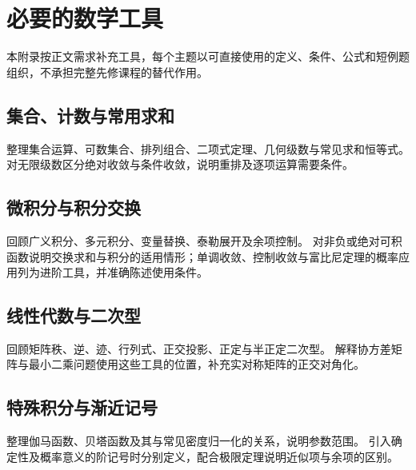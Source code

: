 \setcounter{chapter}{0} %
\chapter{必要的数学工具}
\label{app:ps-prerequisites}

本附录按正文需求补充工具，每个主题以可直接使用的定义、条件、公式和短例题组织，不承担完整先修课程的替代作用。

\section{集合、计数与常用求和}
整理集合运算、可数集合、排列组合、二项式定理、几何级数与常见求和恒等式。
对无限级数区分绝对收敛与条件收敛，说明重排及逐项运算需要条件。

\section{微积分与积分交换}
回顾广义积分、多元积分、变量替换、泰勒展开及余项控制。
对非负或绝对可积函数说明交换求和与积分的适用情形；单调收敛、控制收敛与富比尼定理的概率应用列为进阶工具，并准确陈述使用条件。

\section{线性代数与二次型}
回顾矩阵秩、逆、迹、行列式、正交投影、正定与半正定二次型。
解释协方差矩阵与最小二乘问题使用这些工具的位置，补充实对称矩阵的正交对角化。

\section{特殊积分与渐近记号}
整理伽马函数、贝塔函数及其与常见密度归一化的关系，说明参数范围。
引入确定性及概率意义的阶记号时分别定义，配合极限定理说明近似项与余项的区别。






